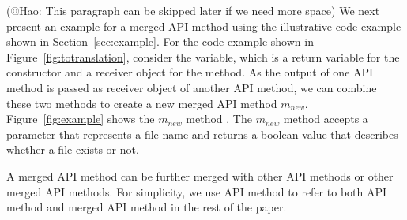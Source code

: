 
(@Hao: This paragraph can be skipped later if we need more space)
We next present an example for a merged API method using the
illustrative code example shown in Section~\ref{sec:example}. For
the code example shown in Figure~\ref{fig:totranslation}, consider
the  variable, which is a return variable for the
constructor and a receiver object for the  method.
As the output of one API method is passed as receiver object of
another API method, we can combine these two methods to create a new
merged API method $m_{new}$. Figure~\ref{fig:example} shows the
$m_{new}$ method . The $m_{new}$
method accepts a  parameter that represents a file
name and returns a boolean value that describes whether a file
exists or not.

A merged API method can be further merged with other API methods or
other merged API methods. For simplicity, we use API method to refer
to both API method and merged API method in the rest of the paper.
